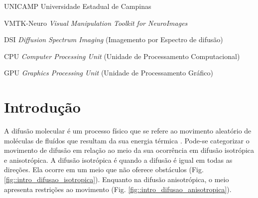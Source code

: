 \documentclass[
    12pt,                %
    oneside,            %
    a4paper,            %
    english,            %
    french,                %
    spanish,            %
    brazil                %
    ]{abntex2}
\begin{document}
\begin{siglas}
\item[UNICAMP] Universidade Estadual de Campinas



\item[VMTK-Neuro] \textit{Visual Manipulation Toolkit for NeuroImages}

\item[DSI] \textit{Diffusion Spectrum Imaging} (Imagemento por Espectro de difusão)

\item [CPU] \textit{Computer Processing Unit} (Unidade de Processamento Computacional)

\item [GPU] \textit{Graphics Processing Unit} (Unidade de Processamento Gráfico)
\end{siglas}





\tableofcontents*
\cleardoublepage



\textual



\chapter{Introdução}
\label{sec:introducao}

A difusão molecular é um processo físico que se refere ao movimento aleatório de moléculas de fluídos que resultam da sua energia térmica \cite{lebihan2006}. 
Pode-se categorizar o movimento de difusão em relação ao meio da sua ocorrência em difusão isotrópica e anisotrópica. A difusão isotrópica é quando a difusão é igual em todas as direções. Ela ocorre em um meio que não oferece obstáculos (Fig. \ref{fig::intro_difusao_isotropica}). Enquanto na difusão anisotrópica, o meio apresenta restrições ao movimento (Fig. \ref{fig::intro_difusao_anisotropica}).
\end{document}
